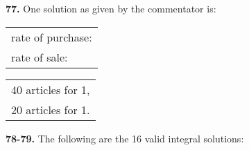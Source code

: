 \documentclass[10pt, openany]{book}
\begin{document}
{{{{{{{{{{{{{{{{{{{{\begin{sloppypar}
\noindent \textbf{77.} One solution as given by the commentator is: 
\vspace{2mm}

\begin{tabular}{l} rate of purchase:\\rate of sale:\end{tabular}
\begin{tabular}{c}40 articles for 1, \\20 articles for 1. \end{tabular}

\end{sloppypar}

\newpage

\noindent \textbf{78-79.} The following are the 16 valid integral solutions:
\vspace{2mm}

}}}}}}}}}}}}}}}}}}}}
\end{document}
